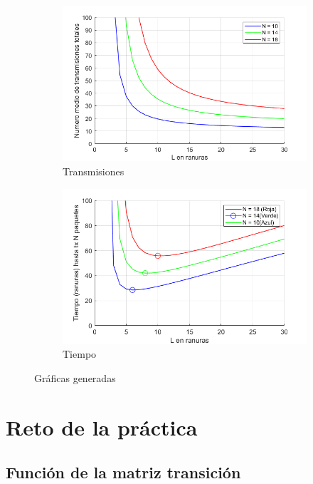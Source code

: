 \documentclass{article}
\begin{document}
\begin{figure}[h]
	\centering
	\begin{subfigure}{0.5\textwidth}
		\includegraphics[width=\linewidth]{Transmisiones.png}
		\caption{Transmisiones}
		\label{fig:subfig1}
	\end{subfigure}%
	\begin{subfigure}{0.5\textwidth}
		\includegraphics[width=\linewidth]{tiempo.png}
		\caption{Tiempo}
		\label{fig:subfig2}
	\end{subfigure}
	\caption{Gráficas generadas}
	\label{fig:entire-figure}
\end{figure}


\section{Reto de la práctica}

\subsection{Función de la matriz transición}
\end{document}
